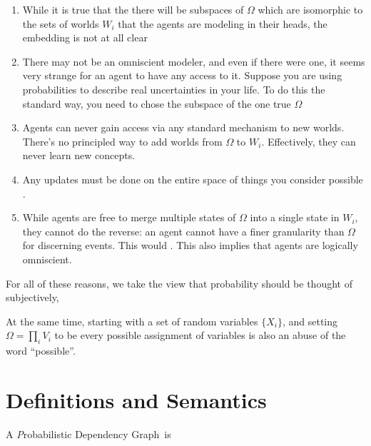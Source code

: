 \documentclass{article}
\newcommand{\modelname}{Probabilistic Dependency Graph}
\begin{document}
	
	\begin{enumerate}
		\item While it is true that the there will be subspaces of $\Omega$ which are isomorphic to the sets of worlds $W_i$ that the agents are modeling in their heads, the embedding is not at all clear \todo{}
		
		\item There may not be an omniscient modeler, and even if there were one, it seems very strange for an agent to have any access to it. Suppose you are using probabilities to describe real uncertainties in your life. To do this the standard way, you need to chose the subspace of the one true $\Omega$ 
		
		\item Agents can never gain access via any standard mechanism to new worlds. There's no principled way to add worlds from $\Omega$ to $W_i$. Effectively, they can never learn new concepts.
		
		\item Any updates must be done on the entire space of things you consider possible .
		
		\item While agents are free to merge multiple states of $\Omega$ into a single state in $W_i$, they cannot do the reverse: an agent cannot have a finer granularity than $\Omega$ for discerning events. This would . This also implies that agents are logically omniscient.
	\end{enumerate}

	For all of these reasons, we take the view that probability should be thought of subjectively, 
	
	
	At the same time, starting with a set of random variables $\{X_i\}$, and setting $\Omega = \prod_{i} V_i$ to be every possible assignment of variables is also an abuse of the word ``possible''.
	
	
	\section{Definitions and Semantics}
	
	
	
	\begin{defn}
		A \emph\modelname\ is 
	\end{defn}
	
\end{document}
